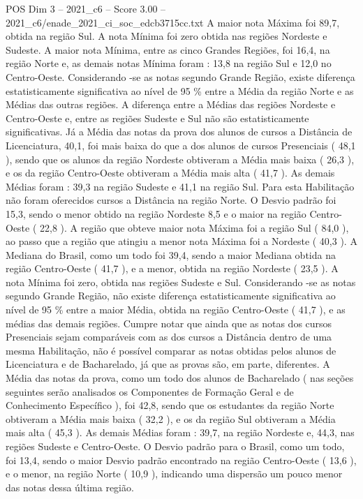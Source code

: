\begin{textsample}{POS Dim 3 – 2021\_c6 – Score 3.00 – 2021\_c6/enade\_2021\_ci\_soc\_edcb3715cc.txt}
A maior nota Máxima foi 89,7, obtida na região Sul.
A nota Mínima foi zero obtida nas regiões Nordeste e Sudeste.
A maior nota Mínima, entre as cinco Grandes Regiões, foi 16,4, na região Norte e, as demais notas Mínima foram : 13,8 na região Sul e 12,0 no Centro-Oeste.
Considerando -se as notas segundo Grande Região, existe diferença estatisticamente significativa ao nível de 95 \% entre a Média da região Norte e as Médias das outras regiões.
A diferença entre a Médias das regiões Nordeste e Centro-Oeste e, entre as regiões Sudeste e Sul não são estatisticamente significativas.
Já a Média das notas da prova dos alunos de cursos a Distância de Licenciatura, 40,1, foi mais baixa do que a dos alunos de cursos Presenciais ( 48,1 ), sendo que os alunos da região Nordeste obtiveram a Média mais baixa ( 26,3 ), e os da região Centro-Oeste obtiveram a Média mais alta ( 41,7 ).
As demais Médias foram : 39,3 na região Sudeste e 41,1 na região Sul.
Para esta Habilitação não foram oferecidos cursos a Distância na região Norte.
O Desvio padrão foi 15,3, sendo o menor obtido na região Nordeste 8,5 e o maior na região Centro-Oeste ( 22,8 ).
A região que obteve maior nota Máxima foi a região Sul ( 84,0 ), ao passo que a região que atingiu a menor nota Máxima foi a Nordeste ( 40,3 ).
A Mediana do Brasil, como um todo foi 39,4, sendo a maior Mediana obtida na região Centro-Oeste ( 41,7 ), e a menor, obtida na região Nordeste ( 23,5 ).
A nota Mínima foi zero, obtida nas regiões Sudeste e Sul.
Considerando -se as notas segundo Grande Região, não existe diferença estatisticamente significativa ao nível de 95 \% entre a maior Média, obtida na região Centro-Oeste ( 41,7 ), e as médias das demais regiões.
Cumpre notar que ainda que as notas dos cursos Presenciais sejam comparáveis com as dos cursos a Distância dentro de uma mesma Habilitação, não é possível comparar as notas obtidas pelos alunos de Licenciatura e de Bacharelado, já que as provas são, em parte, diferentes.
A Média das notas da prova, como um todo dos alunos de Bacharelado ( nas seções seguintes serão analisados os Componentes de Formação Geral e de Conhecimento Específico ), foi 42,8, sendo que os estudantes da região Norte obtiveram a Média mais baixa ( 32,2 ), e os da região Sul obtiveram a Média mais alta ( 45,3 ).
As demais Médias foram : 39,7, na região Nordeste e, 44,3, nas regiões Sudeste e Centro-Oeste.
O Desvio padrão para o Brasil, como um todo, foi 13,4, sendo o maior Desvio padrão encontrado na região Centro-Oeste ( 13,6 ), e o menor, na região Norte ( 10,9 ), indicando uma dispersão um pouco menor das notas dessa última região.

\end{textsample}
